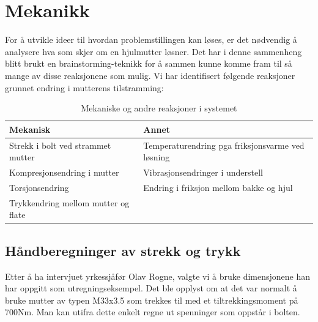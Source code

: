 \section{Mekanikk}

For å utvikle ideer til hvordan problemstillingen kan løses, er det nødvendig å analysere hva som skjer om en hjulmutter løsner. Det har i denne sammenheng blitt brukt en brainstorming-teknikk for å sammen kunne komme fram til så mange av disse reaksjonene som mulig. Vi har identifisert følgende reaksjoner grunnet endring i mutterens tilstramming:

\begin{table}[h]
\caption{Mekaniske og andre reaksjoner i systemet}
\begin{tabular}{|l|l|}
\hline
\textbf{Mekanisk}                   & \textbf{Annet}                                   \\
\hline
Strekk i bolt ved strammet mutter   & Temperaturendring pga friksjonsvarme ved løsning \\
\hline
Kompresjonsendring i mutter         & Vibrasjonsendringer i understell                 \\
\hline
Torsjonsendring                     & Endring i friksjon mellom bakke og hjul          \\
\hline
Trykkendring mellom mutter og flate &                                                \\
\hline
\end{tabular}
\end{table}

\subsection{Håndberegninger av strekk og trykk}

Etter å ha intervjuet yrkessjåfør Olav Rogne, valgte vi å bruke dimensjonene han har oppgitt som utregningseksempel. Det ble opplyst om at det var normalt å bruke mutter av typen M33x3.5 som trekkes til med et tiltrekkingsmoment på 700Nm. Man kan utifra dette enkelt regne ut spenninger som oppstår i bolten.

